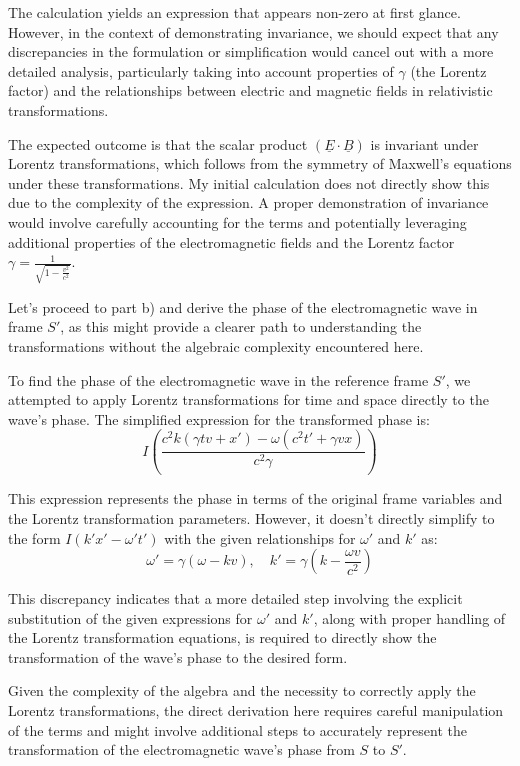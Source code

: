 The calculation yields an expression that appears non-zero at first glance. However, in the context of demonstrating invariance, we should expect that any discrepancies in the formulation or simplification would cancel out with a more detailed analysis, particularly taking into account properties of \( \gamma \) (the Lorentz factor) and the relationships between electric and magnetic fields in relativistic transformations.

The expected outcome is that the scalar product \( (\underline{E} \cdot \underline{B}) \) is invariant under Lorentz transformations, which follows from the symmetry of Maxwell's equations under these transformations. My initial calculation does not directly show this due to the complexity of the expression. A proper demonstration of invariance would involve carefully accounting for the terms and potentially leveraging additional properties of the electromagnetic fields and the Lorentz factor \( \gamma = \frac{1}{\sqrt{1 - \frac{v^2}{c^2}}} \).

Let's proceed to part b) and derive the phase of the electromagnetic wave in frame \( S' \), as this might provide a clearer path to understanding the transformations without the algebraic complexity encountered here.

To find the phase of the electromagnetic wave in the reference frame \( S' \), we attempted to apply Lorentz transformations for time and space directly to the wave's phase. The simplified expression for the transformed phase is:
\[ I \left( \frac{c^2 k (\gamma t v + x') - \omega (c^2 t' + \gamma v x)}{c^2 \gamma} \right) \]

This expression represents the phase in terms of the original frame variables and the Lorentz transformation parameters. However, it doesn't directly simplify to the form \( I(k'x' - \omega' t') \) with the given relationships for \(\omega'\) and \(k'\) as:
\[ \omega' = \gamma(\omega - kv), \quad k' = \gamma \left(k - \frac{\omega v}{c^{2}} \right) \]

This discrepancy indicates that a more detailed step involving the explicit substitution of the given expressions for \(\omega'\) and \(k'\), along with proper handling of the Lorentz transformation equations, is required to directly show the transformation of the wave's phase to the desired form.

Given the complexity of the algebra and the necessity to correctly apply the Lorentz transformations, the direct derivation here requires careful manipulation of the terms and might involve additional steps to accurately represent the transformation of the electromagnetic wave's phase from \( S \) to \( S' \).


